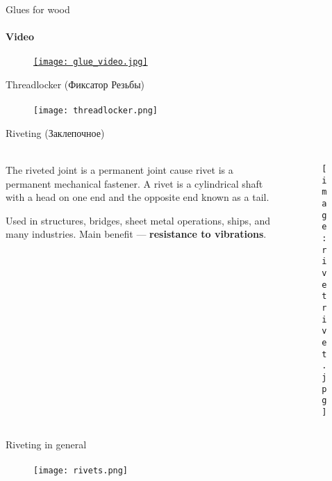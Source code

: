 \documentclass[aspectratio=169]{beamer}
\begin{document}
\begin{frame}[t]{Glues for wood}
    \framesubtitle{Video}
    \vspace{-0.6cm}
    \begin{figure}[H]
        \href{https://youtu.be/pOXIaV024fc}{
            \centering\texttt{[image: glue\_video.jpg]}}
        \label{fig:glue_video.jpg}
    \end{figure}
\end{frame}

\begin{frame}[c]{Threadlocker (Фиксатор Резьбы)}
    \framesubtitle{}
    \vspace{-0.6cm}
    \begin{figure}[H]
        \centering\texttt{[image: threadlocker.png]}
        \label{fig:threadlocker.png}
    \end{figure}
\end{frame}

\begin{frame}[t]{Riveting (Заклепочное)}
    \framesubtitle{}
    \begin{columns}[T,onlytextwidth]
        \begin{column}{0.49\textwidth}
            The riveted joint is a permanent joint cause rivet is a permanent mechanical fastener. A rivet is a cylindrical shaft with a head on one end and the opposite end known as a tail.
            \medskip

            Used in structures, bridges, sheet metal operations, ships, and many industries. Main benefit --- \textbf{resistance to vibrations}.
        \end{column}
        \begin{column}{0.49\textwidth}
            \vspace{-1cm}
            \begin{figure}[H]
                \centering\texttt{[image: rivetrivet.jpg]}
                \label{fig:rivetrivet.jpg}
            \end{figure}
        \end{column}
    \end{columns}
\end{frame}

\begin{frame}[t]{Riveting in general}
    \framesubtitle{}
    \vspace{-0.6cm}
    \begin{figure}[H]
        \centering\texttt{[image: rivets.png]}
        \label{fig:rivets.png}
    \end{figure}
\end{frame}
\end{document}
